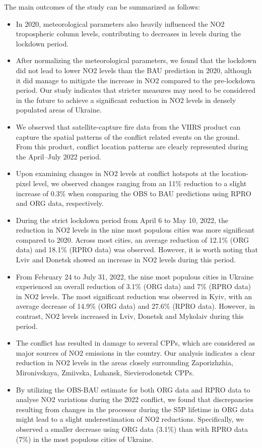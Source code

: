 The main outcomes of the study can be summarized as follows:\par
\begin{itemize}
    \item In 2020, meteorological parameters also heavily influenced the NO2 tropospheric column levels, contributing to decreases in levels during the lockdown period.
    \item After normalizing the meteorological parameters, we found that the lockdown did not lead to lower NO2 levels than the BAU prediction in 2020, although it did manage to mitigate the increase in NO2 compared to the pre-lockdown period. Our study indicates that stricter measures may need to be considered in the future to achieve a significant reduction in NO2 levels in densely populated areas of Ukraine.
    \item We observed that satellite-capture fire data from the VIIRS product can capture the spatial patterns of the conflict related events on the ground. From this product, conflict location patterns are clearly represented during the April–July 2022 period.
    \item Upon examining changes in NO2 levels at conflict hotspots at the location-pixel level, we observed changes ranging from an 11\% reduction to a slight increase of 0.3\% when comparing the OBS to BAU predictions using RPRO and ORG data, respectively.
    \item During the strict lockdown period from April 6 to May 10, 2022, the reduction in NO2 levels in the nine most populous cities was more significant compared to 2020. Across most cities, an average reduction of 12.1\% (ORG data) and 18.1\% (RPRO data) was observed. However, it is worth noting that Lviv and Donetsk showed an increase in NO2 levels during this period.
    \item From February 24 to July 31, 2022, the nine most populous cities in Ukraine experienced an overall reduction of 3.1\% (ORG data) and 7\% (RPRO data) in NO2 levels. The most significant reduction was observed in Kyiv, with an average decrease of 14.9\% (ORG data) and 27.6\% (RPRO data). However, in contrast, NO2 levels increased in Lviv, Donetsk and Mykolaiv during this period.
    \item The conflict has resulted in damage to several CPPs, which are considered as major sources of NO2 emissions in the country. Our analysis indicates a clear reduction in NO2 levels in the areas closely surrounding Zaporizhzhia, Mironivskaya, Zmiivska, Luhansk, Sievierodonetsk CPPs.
    \item By utilizing the OBS-BAU estimate for both ORG data and RPRO data to analyse NO2 variations during the 2022 conflict, we found that discrepancies resulting from changes in the processor during the S5P lifetime in ORG data might lead to a slight underestimation of NO2 reductions. Specifically, we observed a smaller decrease using ORG data (3.1\%) than with RPRO data (7\%) in the most populous cities of Ukraine.
\end{itemize}

